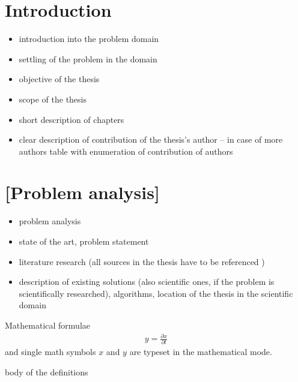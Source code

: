 \documentclass[a4paper,twoside,12pt]{book}
\newtheorem{Definition}{Definition}
\newtheorem{Example}{Example}
\newtheorem{Theorem}{Theorem}
\newcounter{pagesWithoutNumbers}
\begin{document}
\setcounter{pagesWithoutNumbers}{\value{page}}
\mainmatter
\pagestyle{empty}

\cleardoublepage

\pagestyle{PageNumbersChapterTitles}


\chapter{Introduction}

\begin{itemize}
\item introduction into the problem domain
\item settling of the problem in the domain
\item objective of the thesis 
\item scope of the thesis
\item short description of chapters
\item clear description of contribution of the thesis's author – in case of more authors table with enumeration of contribution of authors
\end{itemize}
 
\chapter{[Problem analysis]}

\begin{itemize}
\item  problem analysis
\item state of the art, problem statement
\item  literature research (all sources in the thesis have to be referenced \cite{bib:article,bib:book,bib:conference,bib:internet})
\item description of existing solutions (also scientific ones, if the problem is scientifically researched), algorithms,  location of the thesis in the scientific domain
\end{itemize}



Mathematical formulae  
\begin{align}
y = \frac{\partial x}{\partial t}
\end{align}
and single math symbols $x$ and $y$ are typeset in the mathematical mode.


body of the definitions
%
%
\end{document}
